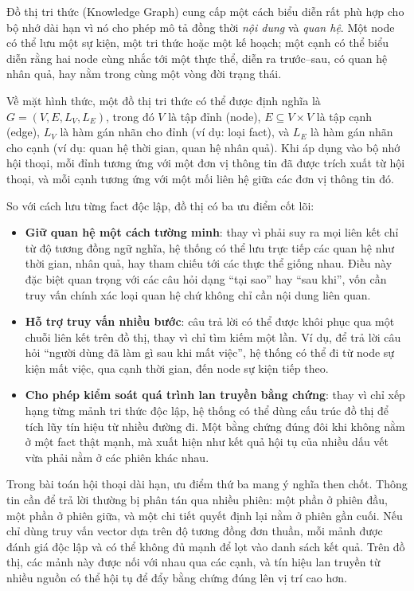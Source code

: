 \documentclass[../main.tex]{subfiles}
\begin{document}
Đồ thị tri thức (Knowledge Graph) cung cấp một cách biểu diễn rất phù hợp cho bộ nhớ dài hạn vì nó cho phép mô tả đồng thời \textit{nội dung} và \textit{quan hệ}. Một node có thể lưu một sự kiện, một tri thức hoặc một kế hoạch; một cạnh có thể biểu diễn rằng hai node cùng nhắc tới một thực thể, diễn ra trước--sau, có quan hệ nhân quả, hay nằm trong cùng một vòng đời trạng thái.

Về mặt hình thức, một đồ thị tri thức có thể được định nghĩa là $G = (V, E, L_V, L_E)$, trong đó $V$ là tập đỉnh (node), $E \subseteq V \times V$ là tập cạnh (edge), $L_V$ là hàm gán nhãn cho đỉnh (ví dụ: loại fact), và $L_E$ là hàm gán nhãn cho cạnh (ví dụ: quan hệ thời gian, quan hệ nhân quả). Khi áp dụng vào bộ nhớ hội thoại, mỗi đỉnh tương ứng với một đơn vị thông tin đã được trích xuất từ hội thoại, và mỗi cạnh tương ứng với một mối liên hệ giữa các đơn vị thông tin đó.

So với cách lưu từng fact độc lập, đồ thị có ba ưu điểm cốt lõi:

\begin{itemize}
    \item \textbf{Giữ quan hệ một cách tường minh}: thay vì phải suy ra mọi liên kết chỉ từ độ tương đồng ngữ nghĩa, hệ thống có thể lưu trực tiếp các quan hệ như thời gian, nhân quả, hay tham chiếu tới các thực thể giống nhau. Điều này đặc biệt quan trọng với các câu hỏi dạng ``tại sao'' hay ``sau khi'', vốn cần truy vấn chính xác loại quan hệ chứ không chỉ cần nội dung liên quan.
    \item \textbf{Hỗ trợ truy vấn nhiều bước}: câu trả lời có thể được khôi phục qua một chuỗi liên kết trên đồ thị, thay vì chỉ tìm kiếm một lần. Ví dụ, để trả lời câu hỏi ``người dùng đã làm gì sau khi mất việc'', hệ thống có thể đi từ node sự kiện mất việc, qua cạnh thời gian, đến node sự kiện tiếp theo.
    \item \textbf{Cho phép kiểm soát quá trình lan truyền bằng chứng}: thay vì chỉ xếp hạng từng mảnh tri thức độc lập, hệ thống có thể dùng cấu trúc đồ thị để tích lũy tín hiệu từ nhiều đường đi. Một bằng chứng đúng đôi khi không nằm ở một fact thật mạnh, mà xuất hiện như kết quả hội tụ của nhiều dấu vết vừa phải nằm ở các phiên khác nhau.
\end{itemize}

Trong bài toán hội thoại dài hạn, ưu điểm thứ ba mang ý nghĩa then chốt. Thông tin cần để trả lời thường bị phân tán qua nhiều phiên: một phần ở phiên đầu, một phần ở phiên giữa, và một chi tiết quyết định lại nằm ở phiên gần cuối. Nếu chỉ dùng truy vấn vector dựa trên độ tương đồng đơn thuần, mỗi mảnh được đánh giá độc lập và có thể không đủ mạnh để lọt vào danh sách kết quả. Trên đồ thị, các mảnh này được nối với nhau qua các cạnh, và tín hiệu lan truyền từ nhiều nguồn có thể hội tụ để đẩy bằng chứng đúng lên vị trí cao hơn.
\end{document}
